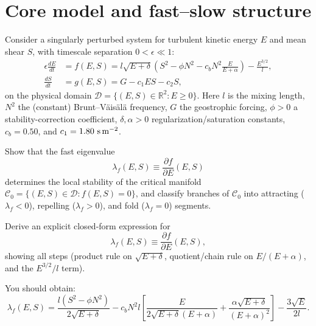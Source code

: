 \documentclass[11pt,fleqn]{article}
\author{\textbf{PhD Candidate:} \textit{[Student Name]} \\ \textbf{Supervisor:} David England (UAH.Edu BLM)}
\date{\today}
\begin{document}
\section{Core model and fast--slow structure}

Consider a singularly perturbed system for turbulent kinetic energy $E$ and
mean shear $S$, with timescale separation $0 < \epsilon \ll 1$:
\begin{align}
\epsilon \frac{dE}{dt} &= f(E,S) = l \sqrt{E + \delta} \left( S^2 - \phi N^2 - c_b N^2 \frac{E}{E + \alpha} \right) - \frac{E^{3/2}}{l}, \label{eq:fast_tke} \\
\frac{dS}{dt} &= g(E,S) = G - c_1 E S - c_2 S, \label{eq:slow_shear}
\end{align}
on the physical domain $\mathcal{D} = \{(E,S) \in \mathbb{R}^2 : E \ge 0\}$.
Here $l$ is the mixing length, $N^2$ the (constant) Brunt--Väisälä frequency,
$G$ the geostrophic forcing, $\phi > 0$ a stability-correction coefficient,
$\delta, \alpha > 0$ regularization/saturation constants, $c_b = 0.50$, and
$c_1 = 1.80\ \text{s\,m}^{-2}$.

Show that the fast eigenvalue
\begin{equation}
    \lambda_f(E,S) \equiv \frac{\partial f}{\partial E}(E,S)
\end{equation}
determines the local stability of the critical manifold $\mathcal{C}_0 = \{(E,S) \in \mathcal{D} : f(E,S) = 0\}$, and classify branches of $\mathcal{C}_0$ into attracting ($\lambda_f<0$), repelling ($\lambda_f>0$), and fold ($\lambda_f=0$) segments.

Derive an explicit closed-form expression for
    \begin{equation}
        \lambda_f(E,S) \equiv \frac{\partial f}{\partial E}(E,S),
    \end{equation}
    showing all steps (product rule on $\sqrt{E+\delta}$, quotient/chain rule on $E/(E+\alpha)$, and the $E^{3/2}/l$ term).

    You should obtain:
\begin{equation}
\lambda_f(E, S) = \frac{l\left(S^2 - \phi N^2\right)}{2\sqrt{E+\delta}} - c_b N^2 l \left[ \frac{E}{2\sqrt{E+\delta}(E+\alpha)} + \frac{\alpha\sqrt{E+\delta}}{(E+\alpha)^2} \right] - \frac{3\sqrt{E}}{2l}.
\end{equation}
\end{document}

